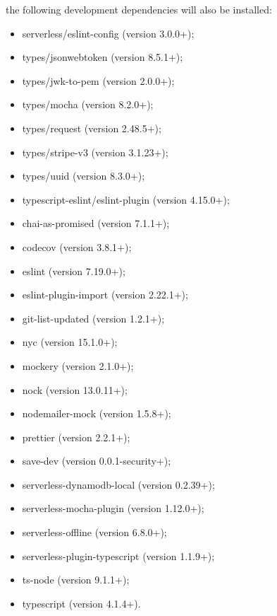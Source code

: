 \begin{enumerate}
\begin{itemize}
\end{itemize}
the following development dependencies will also be installed:
\begin{itemize}
\item serverless/eslint-config (version 3.0.0+);
\item types/jsonwebtoken (version 8.5.1+);
\item types/jwk-to-pem (version 2.0.0+);
\item types/mocha (version 8.2.0+);
\item types/request (version 2.48.5+);
\item types/stripe-v3 (version 3.1.23+);
\item types/uuid (version 8.3.0+);
\item typescript-eslint/eslint-plugin (version 4.15.0+);
\item chai-as-promised (version 7.1.1+);
\item codecov (version 3.8.1+);
\item eslint (version 7.19.0+);
\item eslint-plugin-import (version 2.22.1+);
\item git-list-updated (version 1.2.1+);
\item nyc (version 15.1.0+);
\item mockery (version 2.1.0+);
\item nock (version 13.0.11+);
\item nodemailer-mock (version 1.5.8+);
\item prettier (version 2.2.1+);
\item save-dev (version 0.0.1-security+);
\item serverless-dynamodb-local (version 0.2.39+);
\item serverless-mocha-plugin (version 1.12.0+);
\item serverless-offline (version 6.8.0+);
\item serverless-plugin-typescript (version 1.1.9+);
\item ts-node (version 9.1.1+);
\item typescript (version 4.1.4+).
\end{itemize}
\end{enumerate}